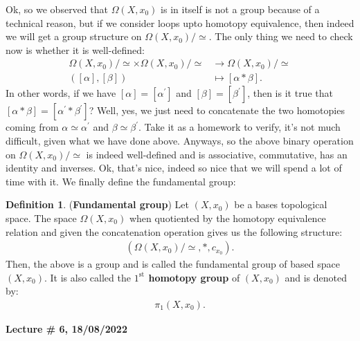 \documentclass[letterpaper,11pt,twoside]{article}
\theoremstyle{definition}
\theoremstyle{definition}
\newtheorem{definition}[proposition]{Definition}
\theoremstyle{definition}
\theoremstyle{definition}
\theoremstyle{definition}
\theoremstyle{definition}
\theoremstyle{remark}
\theoremstyle{definition}
\newcommand{\newlecture}[2]{\begin{center}
    \textbf{Lecture \# #1, #2}
\end{center}}
\newcommand{\loops}[1]{\Omega\left(#1\right)}
\begin{document}
Ok, so we observed that $\loops{X,x_0}$ is in itself is not a group because of a technical reason, but if we consider loops upto homotopy equivalence, then indeed we will get a group structure on $\loops{X,x_0}/\simeq$. The only thing we need to check now is whether it is well-defined:
\begin{align*}
    \loops{X,x_0}/\simeq \times \loops{X,x_0}/\simeq &\longrightarrow \loops{X,x_0}/\simeq \\
    ([\alpha] ,[\beta]) &\longmapsto [\alpha *\beta]. 
\end{align*}
In other words, if we have $[\alpha]=[\alpha^\prime]$ and $[\beta] = [\beta^\prime]$, then is it true that $[\alpha * \beta] = [\alpha^\prime * \beta^\prime]$? Well, yes, we just need to concatenate the two homotopies coming from $\alpha \simeq \alpha^\prime$ and $\beta \simeq \beta^\prime$. Take it as a homework to verify, it's not much difficult, given what we have done above. Anyways, so the above binary operation on $\loops{X,x_0}/\simeq $ is indeed well-defined and is associative, commutative, has an identity and inverses. Ok, that's nice, indeed so nice that we will spend a lot of time with it. We finally define the fundamental group:
\begin{definition}
(\textbf{Fundamental group}) Let $(X,x_0)$ be a bases topological space. The space $\loops{X,x_0}$ when quotiented by the homotopy equivalence relation and given the concatenation operation gives us the following structure:
\begin{align*}
    \left( \loops{X,x_0}/\simeq, * , c_{x_0} \right).
\end{align*}
Then, the above is a group and is called the fundamental group of based space $(X,x_0)$. It is also called the\textbf{ $1^\text{st}$ homotopy group} of $(X,x_0)$ and is denoted by:
\begin{align*}
    \pi_1(X,x_0).
\end{align*}
\end{definition}
\newlecture{6}{18/08/2022}
\end{document}

